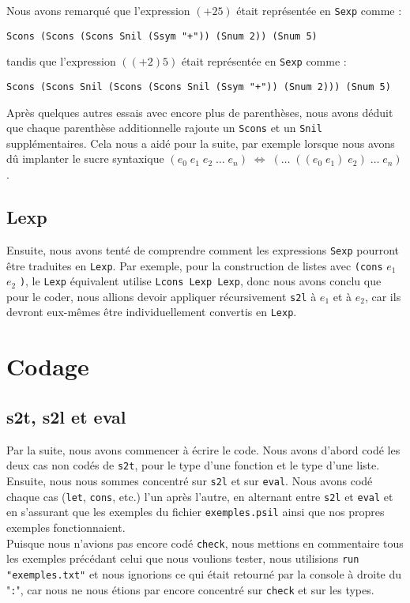 \documentclass[10pt,a4paper]{article}
\begin{document}
Nous avons remarqué que l'expression $(+ 2 5)$ était représentée en \texttt{Sexp} comme :

\begin{lstlisting}
Scons (Scons (Scons Snil (Ssym "+")) (Snum 2)) (Snum 5)
\end{lstlisting}

tandis que l'expression $((+ 2) 5)$ était représentée en \texttt{Sexp} comme :

\begin{lstlisting}
Scons (Scons Snil (Scons (Scons Snil (Ssym "+")) (Snum 2))) (Snum 5)
\end{lstlisting}

Après quelques autres essais avec encore plus de parenthèses, nous avons déduit que chaque parenthèse additionnelle rajoute un \texttt{Scons} et un \texttt{Snil} supplémentaires. Cela nous a aidé pour la suite, par exemple lorsque nous avons dû implanter le sucre syntaxique $(e_0\;e_1\;e_2\;\ldots\;e_n)\;\iff\;(\ldots\;((e_0\;e_1)\;e_2)\;\ldots\;e_n)$.

\subsection{Lexp}

Ensuite, nous avons tenté de comprendre comment les expressions \texttt{Sexp} pourront être traduites en \texttt{Lexp}. Par exemple, pour la construction de listes avec \texttt{(cons} $e_1$ $e_2$ \texttt{)}, le \texttt{Lexp} équivalent utilise \texttt{Lcons Lexp Lexp}, donc nous avons conclu que pour le coder, nous allions devoir appliquer récursivement \texttt{s2l} à $e_1$ et à $e_2$, car ils devront eux-mêmes être individuellement convertis en \texttt{Lexp}.

\section{Codage}
\subsection{s2t, s2l et eval}

Par la suite, nous avons commencer à écrire le code. Nous avons d'abord codé les deux cas non codés de \texttt{s2t}, pour le type d'une fonction et le type d'une liste. Ensuite, nous nous sommes concentré sur \texttt{s2l} et sur \texttt{eval}. Nous avons codé chaque cas (\texttt{let}, \texttt{cons}, etc.) l'un après l'autre, en alternant entre \texttt{s2l} et \texttt{eval} et en s'assurant que les exemples du fichier \texttt{exemples.psil} ainsi que nos propres exemples fonctionnaient.\\
Puisque nous n'avions pas encore codé \texttt{check}, nous mettions en commentaire tous les exemples précédant celui que nous voulions tester, nous utilisions \texttt{run "exemples.txt"} et nous ignorions ce qui était retourné par la console à droite du "\texttt{:}", car nous ne nous étions par encore concentré sur \texttt{check} et sur les types.\\
\end{document}
